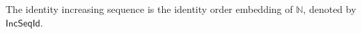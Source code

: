 \begin{definition}
The identity increasing sequence is the identity order embedding of
$\mathbb N$, denoted by $\mathsf{IncSeqId}$.
\end{definition}
